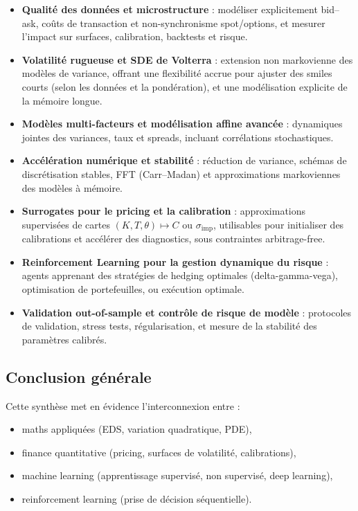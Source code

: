 \documentclass[11pt,a4paper]{article}
\newcommand{\1}{\mathbf{1}}
\begin{document}
\begin{itemize}
  \item \textbf{Qualit\'e des donn\'ees et microstructure} :
        mod\'eliser explicitement bid--ask, co\^uts de transaction et non-synchronisme spot/options, et mesurer l'impact sur
        surfaces, calibration, backtests et risque.
  \item \textbf{Volatilité rugueuse et SDE de Volterra} :
        extension non markovienne des mod\`eles de variance, offrant une
        flexibilit\'e accrue pour ajuster des smiles courts (selon les donn\'ees et la pond\'eration),
        et une mod\'elisation explicite de la m\'emoire longue.
  \item \textbf{Modèles multi-facteurs et modélisation affine avancée} :
        dynamiques jointes des variances, taux et spreads, incluant corr\'elations
        stochastiques.
  \item \textbf{Acc\'el\'eration num\'erique et stabilit\'e} :
        r\'eduction de variance, sch\'emas de discr\'etisation stables, FFT (Carr--Madan) et approximations markoviennes
        des mod\`eles \`a m\'emoire.
  \item \textbf{Surrogates pour le pricing et la calibration} :
        approximations supervis\'ees de cartes $(K,T,\theta)\mapsto C$ ou $\sigma_{\mathrm{imp}}$, utilisables pour initialiser
        des calibrations et acc\'el\'erer des diagnostics, sous contraintes arbitrage-free.
  \item \textbf{Reinforcement Learning pour la gestion dynamique du risque} :
        agents apprenant des stratégies de hedging optimales
        (delta-gamma-vega), optimisation de portefeuilles, ou exécution optimale.
  \item \textbf{Validation out-of-sample et contr\^ole de risque de mod\`ele} :
        protocoles de validation, stress tests, r\'egularisation, et mesure de la stabilit\'e des param\`etres calibr\'es.
\end{itemize}

\subsection{Conclusion générale}

Cette synthèse met en évidence l'interconnexion entre :

\begin{itemize}
  \item maths appliquées (EDS, variation quadratique, PDE),
  \item finance quantitative (pricing, surfaces de volatilité, calibrations),
  \item machine learning (apprentissage supervisé, non supervisé, deep learning),
  \item reinforcement learning (prise de décision séquentielle).
\end{itemize}
\end{document}
